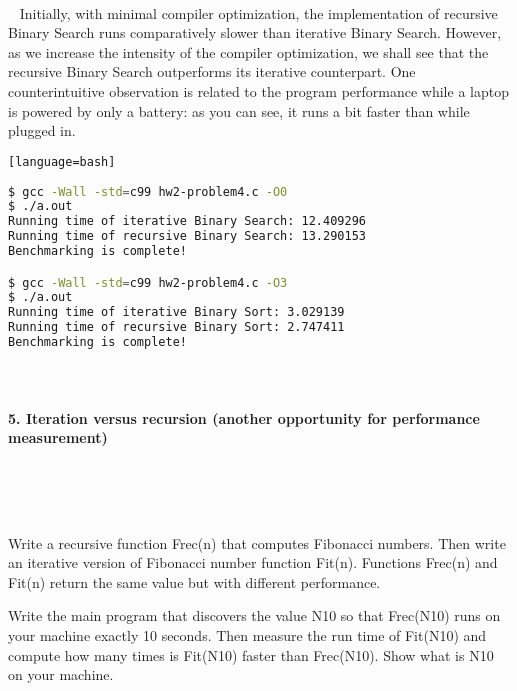\documentclass{article}
\begin{document}
\paragraph{}\
	\rmfamily
	Initially, with minimal compiler optimization, the implementation of recursive Binary Search runs comparatively slower than iterative Binary Search.
	However, as we increase the intensity of the compiler optimization, we shall see that the recursive Binary Search outperforms its iterative counterpart. One counterintuitive observation is related to the program performance while a laptop is powered by only a battery: as you can see, it runs a bit faster than while plugged in.

	\ttfamily
	\begin{lstlisting}[basicstyle=\small, language=bash][language=bash]	
	
$ gcc -Wall -std=c99 hw2-problem4.c -O0
$ ./a.out
Running time of iterative Binary Search: 12.409296
Running time of recursive Binary Search: 13.290153
Benchmarking is complete!

$ gcc -Wall -std=c99 hw2-problem4.c -O3
$ ./a.out
Running time of iterative Binary Sort: 3.029139
Running time of recursive Binary Sort: 2.747411
Benchmarking is complete!
	\end{lstlisting}

\paragraph{}\

	
	\rmfamily
	
	\paragraph{5. Iteration versus recursion (another opportunity for performance measurement) }\
	
	\rmfamily\
	
		Write a recursive function Frec(n) that computes Fibonacci numbers. Then write an iterative version of Fibonacci number function Fit(n). Functions Frec(n) and Fit(n) return the same value but with different performance.
		\newline
		
		Write the main program that discovers the value N10 so that Frec(N10) runs on your machine exactly 10 seconds. Then measure the run time of Fit(N10) and compute how many times is Fit(N10) faster than Frec(N10). Show what is N10 on your machine.
		\newline
		
\end{document}
